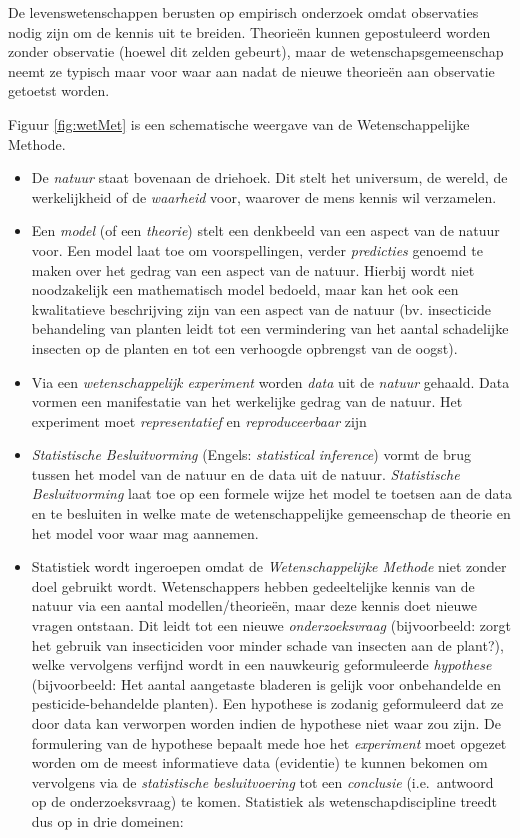\documentclass[
  12pt,dutch,coursenotes]{book}
\begin{document}
De levenswetenschappen berusten op empirisch onderzoek omdat observaties nodig zijn om de kennis uit te breiden. Theorieën kunnen gepostuleerd worden zonder observatie (hoewel dit zelden gebeurt), maar de wetenschapsgemeenschap neemt ze typisch maar voor waar aan nadat de nieuwe theorieën aan observatie getoetst worden.

Figuur \ref{fig:wetMet} is een schematische weergave van de Wetenschappelijke Methode.

\begin{itemize}
\item
  De \emph{natuur} staat bovenaan de driehoek. Dit stelt het universum, de wereld, de werkelijkheid of de \emph{waarheid} voor, waarover de mens kennis wil verzamelen.
\item
  Een \emph{model} (of een \emph{theorie}) stelt een denkbeeld van een aspect van de natuur voor. Een model laat toe om voorspellingen, verder \emph{predicties} genoemd te maken over het gedrag van een aspect van de natuur. Hierbij wordt niet noodzakelijk een mathematisch model bedoeld, maar kan het ook een kwalitatieve beschrijving zijn van een aspect van de natuur (bv. insecticide behandeling van planten leidt tot een vermindering van het aantal schadelijke insecten op de planten en tot een verhoogde opbrengst van de oogst).
\item
  Via een \emph{wetenschappelijk experiment} worden \emph{data} uit de \emph{natuur} gehaald. Data vormen een manifestatie van het werkelijke gedrag van de natuur. Het experiment moet \emph{representatief} en \emph{reproduceerbaar} zijn
\item
  \emph{Statistische Besluitvorming} (Engels: \emph{statistical inference}) vormt de brug tussen het model van de natuur en de data uit de natuur. \emph{Statistische Besluitvorming} laat toe op een formele wijze het model te toetsen aan de data en te besluiten in welke mate de wetenschappelijke gemeenschap de theorie en het model voor waar mag aannemen.
\item
  Statistiek wordt ingeroepen omdat de \emph{Wetenschappelijke Methode} niet zonder doel gebruikt wordt. Wetenschappers hebben gedeeltelijke kennis van de natuur via een aantal modellen/theorieën, maar deze kennis doet nieuwe vragen ontstaan. Dit leidt tot een nieuwe \emph{onderzoeksvraag} (bijvoorbeeld: zorgt het gebruik van insecticiden voor minder schade van insecten aan de plant?), welke vervolgens verfijnd wordt in een nauwkeurig geformuleerde \emph{hypothese} (bijvoorbeeld: Het aantal aangetaste bladeren is gelijk voor onbehandelde en pesticide-behandelde planten). Een hypothese is zodanig geformuleerd dat ze door data kan verworpen worden indien de hypothese niet waar zou zijn. De formulering van de hypothese bepaalt mede hoe het \emph{experiment} moet opgezet worden om de meest informatieve data (evidentie) te kunnen bekomen om vervolgens via de \emph{statistische besluitvoering} tot een \emph{conclusie} (i.e.~antwoord op de onderzoeksvraag) te komen. Statistiek als wetenschapdiscipline treedt dus op in drie domeinen:


\end{itemize}
\end{document}
